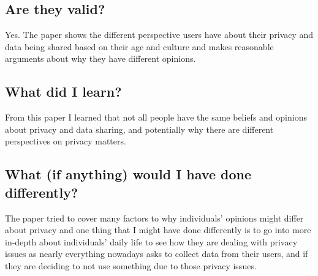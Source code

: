 \documentclass[11pt,a4paper]{article}
\begin{document}
\subsection*{Are they valid?}
Yes. The paper shows the different perspective users have about their privacy and data being shared based on their age and culture and makes reasonable arguments about why they have different opinions. 

\subsection*{What did I learn?}
From this paper I learned that not all people have the same beliefs and opinions about privacy and data sharing, and potentially why there are different perspectives on privacy matters.

\subsection*{What (if anything) would I have done differently?}
The paper tried to cover many factors to why individuals’ opinions might differ about privacy and one thing that I might have done differently is to go into more in-depth about individuals’ daily life to see how they are dealing with privacy issues as nearly everything nowadays asks to collect data from their users, and if they are deciding to not use something due to those privacy issues.
\end{document}
